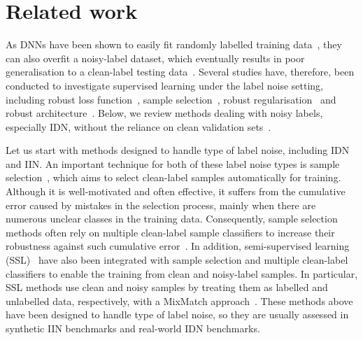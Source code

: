 \documentclass[10pt,twocolumn,letterpaper]{article}
\begin{document}
%
     \section{Related work}
\label{sec:related_work}

As DNNs have been shown to easily fit randomly labelled training data~\cite{zhang2017understanding}, they can also overfit a noisy-label dataset, which eventually results in poor generalisation to a clean-label testing data~\cite{neyshabur2017exploring, arpit2017closer, liu2020early, zhang2021learning_}. 
Several studies have, therefore, been conducted to investigate supervised learning under the label noise setting, including robust loss function~\cite{ma2020normalized, wang2019imae}, sample selection~\cite{wang2018iterative, song2019selfie, song2021robust}, robust regularisation~\cite{jenni2018deep, wei2021open, menon2019can, goodfellow2014explaining} and robust architecture~\cite{xiao2015learning, cheng2020weakly, han2018masking, kong2021resolving}. Below, we review methods dealing with noisy labels, especially IDN, without the reliance on clean validation sets~\cite{veit2017learning, hendrycks2018using, ren2018learning}.



Let us start with methods designed to handle  type of label noise, including IDN and IIN.
An important technique for both of these label noise types is sample selection~\cite{wang2018iterative, song2019selfie, song2021robust}, which aims to select clean-label samples automatically for training. Although it is well-motivated and often effective, it suffers from the cumulative error caused by mistakes in the selection process, mainly when there are numerous unclear classes in the training data. Consequently, sample selection methods often rely on multiple clean-label sample classifiers to increase their robustness against such cumulative error~\cite{li2020dividemix}. 
In addition, semi-supervised learning (SSL)~\cite{cordeiro2021propmix, li2020dividemix, song2019selfie, zheltonozhskii2022contrast, kim2021fine, bernhardt2022active} have also been integrated with sample selection and multiple clean-label classifiers to enable the training from clean and noisy-label samples. 
In particular, SSL methods use clean and noisy samples by treating them as labelled and unlabelled data, respectively, with a MixMatch approach~\cite{berthelot2019mixmatch}. These methods above have been designed to handle  type of label noise, so they are usually assessed in synthetic IIN benchmarks and real-world IDN benchmarks.
\end{document}
